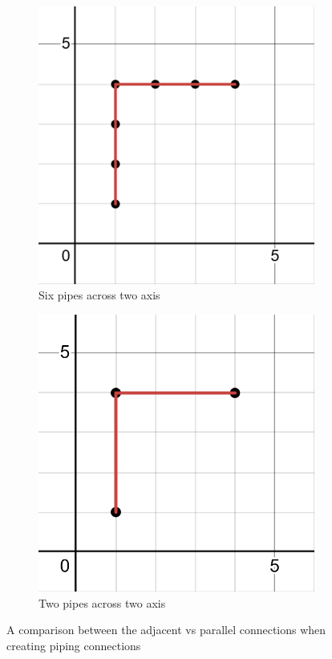 \begin{figure}[H]
    \begin{subfigure}{0.4\linewidth}
        \includegraphics[width=\linewidth]{sixpoints.png}
        \caption{Six pipes across two axis}
    \end{subfigure}
    \hfill
    \begin{subfigure}{0.4\linewidth}
        \includegraphics[width=\linewidth]{straightlinetoapoint.png}
        \caption{Two pipes across two axis}
    \end{subfigure}
        \caption{A comparison between the adjacent vs parallel connections when creating piping connections}
        \label{fig:6v2pipes}
\end{figure}
